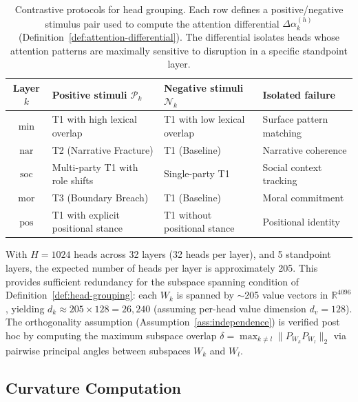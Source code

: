 \begin{table}[h]
\centering
\caption{Contrastive protocols for head grouping. Each row defines a positive/negative
stimulus pair used to compute the attention differential $\Delta\alpha^{(h)}_k$
(Definition~\ref{def:attention-differential}). The differential isolates heads whose
attention patterns are maximally sensitive to disruption in a specific standpoint layer.}
\label{tab:contrastive-protocols}
\begin{tabular}{@{}clll@{}}
\toprule
\textbf{Layer $k$} & \textbf{Positive stimuli $\mathcal{P}_k$} & \textbf{Negative stimuli
$\mathcal{N}_k$} & \textbf{Isolated failure} \\
\midrule
$\mathrm{min}$ & T1 with high lexical overlap & T1 with low lexical overlap & Surface
pattern matching \\
$\mathrm{nar}$ & T2 (Narrative Fracture) & T1 (Baseline) & Narrative coherence \\
$\mathrm{soc}$ & Multi-party T1 with role shifts & Single-party T1 & Social context tracking \\
$\mathrm{mor}$ & T3 (Boundary Breach) & T1 (Baseline) & Moral commitment \\
$\mathrm{pos}$ & T1 with explicit positional stance & T1 without positional stance & Positional
identity \\
\bottomrule
\end{tabular}
\end{table}

\begin{remark}
\label{rem:head-coverage}
With $H = 1024$ heads across 32 layers (32 heads per layer), and 5 standpoint layers, the
expected number of heads per layer is approximately 205. This provides sufficient redundancy
for the subspace spanning condition of Definition~\ref{def:head-grouping}: each $W_k$ is
spanned by $\sim$205 value vectors in $\mathbb{R}^{4096}$, yielding $d_k \approx 205 \times
128 = 26{,}240$ (assuming per-head value dimension $d_v = 128$). The orthogonality
assumption (Assumption~\ref{ass:independence}) is verified post hoc by computing the
maximum subspace overlap $\delta = \max_{k \neq l} \|P_{W_k} P_{W_l}\|_2$ via pairwise
principal angles between subspaces $W_k$ and $W_l$.
\end{remark}

\subsection{Curvature Computation}
\label{sec:exp-curvature}

